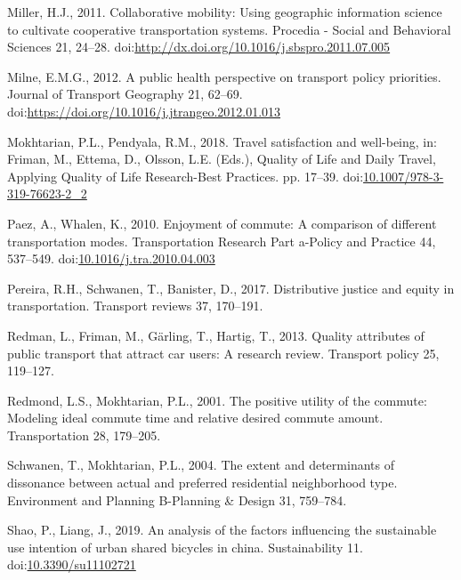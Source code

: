 \documentclass[]{elsarticle} %
\begin{document}
\leavevmode\hypertarget{ref-Miller2011collaborative}{}%
Miller, H.J., 2011. Collaborative mobility: Using geographic information
science to cultivate cooperative transportation systems. Procedia -
Social and Behavioral Sciences 21, 24--28.
doi:\href{https://doi.org/http://dx.doi.org/10.1016/j.sbspro.2011.07.005}{http://dx.doi.org/10.1016/j.sbspro.2011.07.005}

\leavevmode\hypertarget{ref-Milne2012public}{}%
Milne, E.M.G., 2012. A public health perspective on transport policy
priorities. Journal of Transport Geography 21, 62--69.
doi:\href{https://doi.org/https://doi.org/10.1016/j.jtrangeo.2012.01.013}{https://doi.org/10.1016/j.jtrangeo.2012.01.013}

\leavevmode\hypertarget{ref-Mokhtarian2018travel}{}%
Mokhtarian, P.L., Pendyala, R.M., 2018. Travel satisfaction and
well-being, in: Friman, M., Ettema, D., Olsson, L.E. (Eds.), Quality of
Life and Daily Travel, Applying Quality of Life Research-Best Practices.
pp. 17--39.
doi:\href{https://doi.org/10.1007/978-3-319-76623-2_2}{10.1007/978-3-319-76623-2\_2}

\leavevmode\hypertarget{ref-Paez2010enjoyment}{}%
Paez, A., Whalen, K., 2010. Enjoyment of commute: A comparison of
different transportation modes. Transportation Research Part a-Policy
and Practice 44, 537--549.
doi:\href{https://doi.org/10.1016/j.tra.2010.04.003}{10.1016/j.tra.2010.04.003}

\leavevmode\hypertarget{ref-Pereira2017distributive}{}%
Pereira, R.H., Schwanen, T., Banister, D., 2017. Distributive justice
and equity in transportation. Transport reviews 37, 170--191.

\leavevmode\hypertarget{ref-Redman2013quality}{}%
Redman, L., Friman, M., Gärling, T., Hartig, T., 2013. Quality
attributes of public transport that attract car users: A research
review. Transport policy 25, 119--127.

\leavevmode\hypertarget{ref-Redmond2001positive}{}%
Redmond, L.S., Mokhtarian, P.L., 2001. The positive utility of the
commute: Modeling ideal commute time and relative desired commute
amount. Transportation 28, 179--205.

\leavevmode\hypertarget{ref-Schwanen2004extent}{}%
Schwanen, T., Mokhtarian, P.L., 2004. The extent and determinants of
dissonance between actual and preferred residential neighborhood type.
Environment and Planning B-Planning \& Design 31, 759--784.

\leavevmode\hypertarget{ref-Shao2019analysis}{}%
Shao, P., Liang, J., 2019. An analysis of the factors influencing the
sustainable use intention of urban shared bicycles in china.
Sustainability 11.
doi:\href{https://doi.org/10.3390/su11102721}{10.3390/su11102721}
\end{document}
